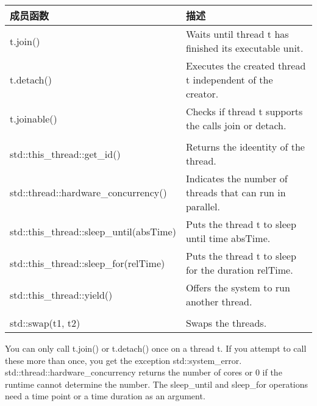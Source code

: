 \begin{longtable}[c]{|l|l|}
\hline
\textbf{成员函数}                                                   & \textbf{描述}                                      \\ \hline
\endfirsthead
%
\endhead
%
t.join()                                                                   & Waits until thread t has finished its executable unit.    \\ \hline
t.detach()                                                                 & Executes the created thread t independent of the creator. \\ \hline
t.joinable()                                                               & Checks if thread t supports the calls join or detach.     \\ \hline
\begin{tabular}[c]{@{}l@{}}t.get\_id() and\\ std::this\_thread::get\_id()\end{tabular} & Returns the ideentity of the thread. \\ \hline
std::thread::hardware\_concurrency()                                       & Indicates the number of threads that can run in parallel. \\ \hline
std::this\_thread::sleep\_until(absTime)                                   & Puts the thread t to sleep until time absTime.            \\ \hline
std::this\_thread::sleep\_for(relTime)                                     & Puts the thread t to sleep for the duration relTime.      \\ \hline
std::this\_thread::yield()                                                 & Offers the system to run another thread.                  \\ \hline
\begin{tabular}[c]{@{}l@{}}t.swap(t2) and\\ std::swap(t1, t2)\end{tabular} & Swaps the threads.                                        \\ \hline
\end{longtable}

You can only call t.join() or t.detach() once on a thread t. If you attempt to call these more than once, you get the exception std::system\_error. std::thread::hardware\_concurrency returns the number of cores or 0 if the runtime cannot determine the number. The sleep\_until and sleep\_for operations need a time point or a time duration as an argument.

